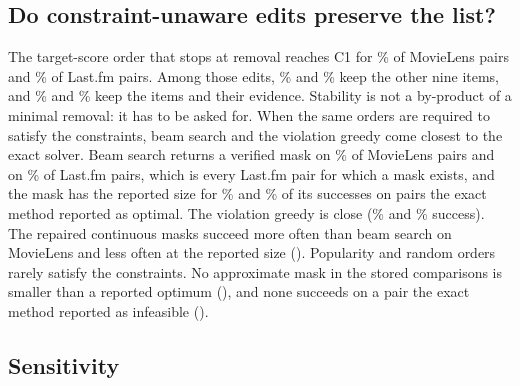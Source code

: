 \documentclass[11pt]{article}
\begin{document}
\subsection{Do constraint-unaware edits preserve the list?}

\begin{table}[t]
\centering
\caption{Approximate methods under C1 + C2 + C3. Success is the share of all \NPairs{} pairs for which the verifier
accepts the mask. Exact size is the share of those accepted masks, among pairs with a reported optimum, that have
that optimum's size. For the stop-at-C1 row, success is the share of pairs whose removal-only mask happens to
satisfy C1 + C2 + C3.}
\label{tab:heuristics}
\resizebox{\linewidth}{!}{}
\end{table}

The target-score order that stops at removal reaches C1 for \MLCStopCOne\% of MovieLens pairs and \LFCStopCOne\% of
Last.fm pairs. Among those edits, \MLCStopList\% and \LFCStopList\% keep the other nine items, and \MLCStopAll\% and
\LFCStopAll\% keep the items and their evidence. Stability is not a by-product of a minimal removal: it has to be
asked for. When the same orders are required to satisfy the constraints, beam search and the violation greedy come
closest to the exact solver. Beam search returns a verified mask on \MLCbeamSucc\% of MovieLens pairs and on
\LFCbeamSucc\% of Last.fm pairs, which is every Last.fm pair for which a mask exists, and the mask has the reported
size for \MLCbeamExact\% and \LFCbeamExact\% of its successes on pairs the exact method reported as optimal. The
violation greedy is close (\MLCgreedyviolationSucc\% and \LFCgreedyviolationSucc\% success). The repaired continuous
masks succeed more often than beam search on MovieLens and less often at the reported size ().
Popularity and random orders rarely satisfy the constraints. No approximate mask in the stored comparisons is smaller
than a reported optimum (\SmallerThanOpt{}), and none succeeds on a pair the exact method reported as infeasible
(\SuccessOnInf{}).

\subsection{Sensitivity}

\begin{table}[t]
\centering
\caption{Evidence threshold $\alpha$ on a separate MovieLens sample (100 users, 1{,}000 pairs, C1 + C2 + C3,
$K=10$). Outcomes are percentages. The mean size is over the pairs whose optimum was confirmed, so pairs that
become infeasible drop out of it.}
\label{tab:alpha}

\end{table}
\end{document}
